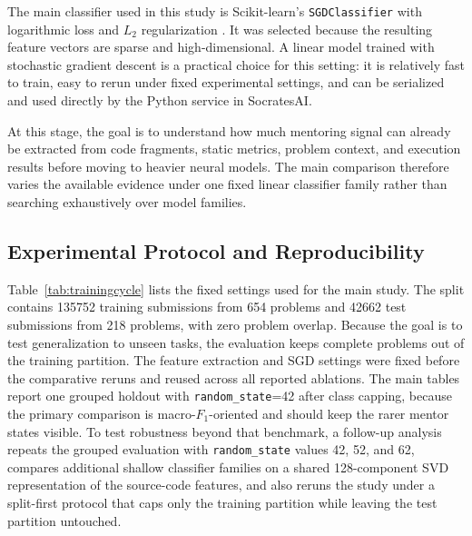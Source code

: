 \documentclass[conference]{IEEEtran}
\begin{document}
The main classifier used in this study is Scikit-learn's \texttt{SGDClassifier} with logarithmic loss and $L_2$ regularization \cite{Pedregosa2011}. It was selected because the resulting feature vectors are sparse and high-dimensional. A linear model trained with stochastic gradient descent is a practical choice for this setting: it is relatively fast to train, easy to rerun under fixed experimental settings, and can be serialized and used directly by the Python service in SocratesAI.

At this stage, the goal is to understand how much mentoring signal can already be extracted from code fragments, static metrics, problem context, and execution results before moving to heavier neural models. The main comparison therefore varies the available evidence under one fixed linear classifier family rather than searching exhaustively over model families.

\subsection{Experimental Protocol and Reproducibility}

Table~\ref{tab:trainingcycle} lists the fixed settings used for the main study. The split contains 135752 training submissions from 654 problems and 42662 test submissions from 218 problems, with zero problem overlap. Because the goal is to test generalization to unseen tasks, the evaluation keeps complete problems out of the training partition. The feature extraction and SGD settings were fixed before the comparative reruns and reused across all reported ablations. The main tables report one grouped holdout with \texttt{random\_state}=42 after class capping, because the primary comparison is macro-$F_1$-oriented and should keep the rarer mentor states visible. To test robustness beyond that benchmark, a follow-up analysis repeats the grouped evaluation with \texttt{random\_state} values 42, 52, and 62, compares additional shallow classifier families on a shared 128-component SVD representation of the source-code features, and also reruns the study under a split-first protocol that caps only the training partition while leaving the test partition untouched.
\end{document}
